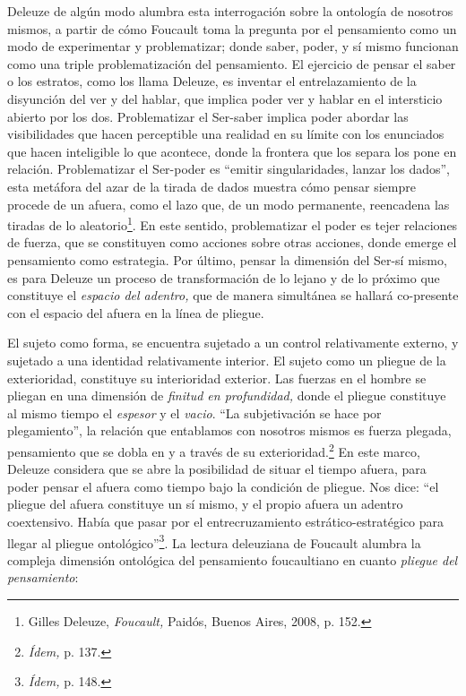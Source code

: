 Deleuze de algún modo alumbra esta interrogación sobre la ontología de nosotros mismos, a partir de cómo Foucault toma la pregunta por el pensamiento como un modo de experimentar y problematizar; donde saber, poder, y sí mismo funcionan como una triple problematización del pensamiento. El ejercicio de pensar el saber o los estratos, como los llama Deleuze, es inventar el entrelazamiento de la disyunción del ver y del hablar, que implica poder ver y hablar en el intersticio abierto por los dos. Problematizar el Ser-saber implica poder abordar las visibilidades que hacen perceptible una realidad en su límite con los enunciados que hacen inteligible lo que acontece, donde la frontera que los separa los pone en relación. Problematizar el Ser-poder es \enquote{emitir singularidades, lanzar los dados}, esta metáfora del azar de la tirada de dados muestra cómo pensar siempre procede de un afuera, como el lazo que, de un modo permanente, reencadena las tiradas de lo aleatorio\footnote{Gilles Deleuze, \emph{Foucault,} Paidós, Buenos Aires, 2008, p. 152.}. En este sentido, problematizar el poder es tejer relaciones de fuerza, que se constituyen como acciones sobre otras acciones, donde emerge el pensamiento como estrategia. Por último, pensar la dimensión del Ser-sí mismo, es para Deleuze un proceso de transformación de lo lejano y de lo próximo que constituye el \emph{espacio del adentro,} que de manera simultánea se hallará co-presente con el espacio del afuera en la línea de pliegue.

El sujeto como forma, se encuentra sujetado a un control relativamente externo, y sujetado a una identidad relativamente interior. El sujeto como un pliegue de la exterioridad, constituye su interioridad exterior. Las fuerzas en el hombre se pliegan en una dimensión de \emph{finitud en profundidad,} donde el pliegue constituye al mismo tiempo el \emph{espesor} y el \emph{vacio}. \enquote{La subjetivación se hace por plegamiento}, la relación que entablamos con nosotros mismos es fuerza plegada, pensamiento que se dobla en y a través de su exterioridad.\footnote{\emph{Ídem,} p. 137.} En este marco, Deleuze considera que se abre la posibilidad de situar el tiempo afuera, para poder pensar el afuera como tiempo bajo la condición de pliegue. Nos dice: \enquote{el pliegue del afuera constituye un sí mismo, y el propio afuera un adentro coextensivo. Había que pasar por el entrecruzamiento estrático-estratégico para llegar al pliegue ontológico}\footnote{\emph{Ídem,} p. 148.}. La lectura deleuziana de Foucault alumbra la compleja dimensión ontológica del pensamiento foucaultiano en cuanto \emph{pliegue del pensamiento}:

